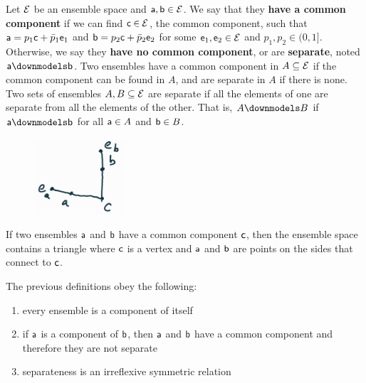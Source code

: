 \begin{mathSection}
\begin{defn}
	Let $\Ens$ be an ensemble space and $\ens[a], \ens[b] \in \Ens$. We say that they \textbf{have a common component} if we can find $\ens[c] \in \Ens$, the common component, such that $\ens[a] = p_1 \ens[c] + \bar{p}_1 \ens_1$ and $\ens[b] = p_2 \ens[c] + \bar{p}_2 \ens_2$ for some $\ens_1, \ens_2 \in \Ens$ and $p_1, p_2 \in (0,1]$. Otherwise, we say they \textbf{have no common component}, or are \textbf{separate}, noted $\ens[a] \separate \ens[b]$. Two ensembles have a common component in $A \subseteq \Ens$ if the common component can be found in $A$, and are separate in $A$ if there is none. Two sets of ensembles $A, B \subseteq \Ens$ are separate if all the elements of one are separate from all the elements of the other. That is, $A \separate B$ if $\ens[a] \separate \ens[b]$ for all $\ens[a] \in A$ and $\ens[b] \in B$.
\end{defn}

\begin{figure}[H]
	\centering
	\includegraphics[width=0.3\textwidth]{tempimages/CommonComponent.jpg}
\end{figure}

\begin{remark}
	If two ensembles $\ens[a]$ and $\ens[b]$ have a common component $\ens[c]$, then the ensemble space contains a triangle where $\ens[c]$ is a vertex and $\ens[a]$ and $\ens[b]$ are points on the sides that connect to $\ens[c]$.
\end{remark}

\begin{coro}
	The previous definitions obey the following:
	\begin{enumerate}
		\item every ensemble is a component of itself
		\item if $\ens[a]$ is a component of $\ens[b]$, then $\ens[a]$ and $\ens[b]$ have a common component and therefore they are not separate
		\item separateness is an irreflexive symmetric relation
	\end{enumerate}
\end{coro}


\end{mathSection}
